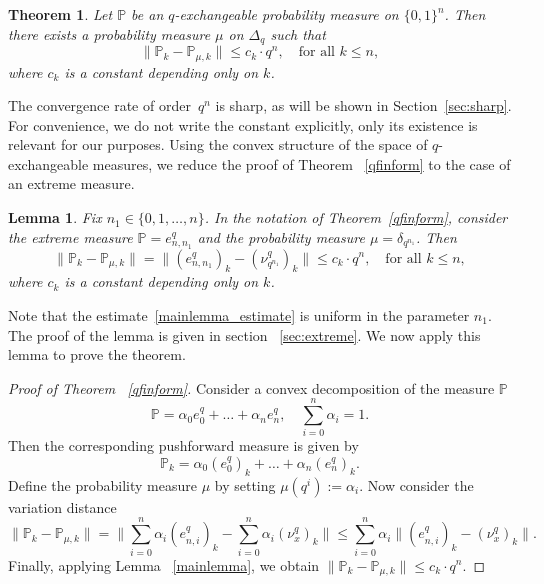 \documentclass[12pt, a4paper]{amsart}
\numberwithin{equation}{subsection}
\newtheorem{theorem}[equation]{Theorem}
\newtheorem{lemma}[equation]{Lemma}
\theoremstyle{definition}
\newcommand{\bP}{{\mathbb P}}
\begin{document}
\begin{theorem}\label{qfinform}
Let $\mathbb{P}$ be an $q$-exchangeable probability measure on $\{0, 1\}^{n}$. Then there exists a probability measure $\mu$ on $\Delta_{q}$ such that
    \begin{equation}
        \|\mathbb{P}_{k} - \mathbb{P}_{\mu,k}\| \leqslant c_{k} \cdot q^{n},  \quad \text{for all } k \leqslant n,
    \end{equation}
   where $c_k$ is a constant depending only on $k$.

\end{theorem}
\noindent The convergence rate of order~$q^{n}$ is sharp, as will be shown in Section~\ref{sec:sharp}. For convenience, we do not write the constant explicitly, only its existence is relevant for our purposes.
Using the convex structure of the space of $q$-exchangeable measures, we reduce the proof of Theorem ~\eqref{qfinform} to the case of an extreme measure.
\begin{lemma}\label{mainlemma} Fix $n_{1} \in \{0,1,\ldots,n\}$. In the notation of Theorem~\eqref{qfinform}, consider the extreme measure $\mathbb{P} = e^{q}_{n, n_{1}}$ and the probability measure $\mu = \delta_{q^{n_{1}}}$. Then
\begin{equation}\label{mainlemma_estimate}
\|\bP_{k} - \bP_{\mu,k}\| = \|(e^{q}_{n, n_{1}})_{k} -  (\nu^{q}_{q^{n_{1}}})_{k}\| \leqslant c_{k} \cdot q^{n}, \quad \text{for all } k \leqslant n,   
\end{equation}
where $c_k$ is a constant depending only on $k$.
\end{lemma}
\noindent Note that the estimate~\eqref{mainlemma_estimate} is uniform in the parameter $n_{1}$. The proof of the lemma is given in section ~\eqref{sec:extreme}. We now apply this lemma to prove the theorem.
\begin{proof}[Proof of Theorem ~\eqref{qfinform}]
Consider a convex decomposition of the measure $\bP$
\begin{equation*}
\bP = \alpha_{0}e^{q}_{0}+\ldots+\alpha_{n}e^{q}_{n}, \quad \sum_{i=0}^{n} \alpha_{i} = 1.
\end{equation*}
Then the corresponding pushforward measure is given by
\begin{equation*}
\bP_{k} = \alpha_{0}(e^{q}_{0})_{k}+\ldots+\alpha_{n}(e^{q}_{n})_{k}.
\end{equation*}
Define the probability measure $\mu$ by setting $\mu(q^{i}):=\alpha_{i}.$
Now consider the variation distance
\begin{equation*}
\|\bP_{k} - \bP_{\mu,k} \| = \|\sum_{i=0}^{n}\alpha_{i} (e^{q}_{n, i})_{k}  - \sum_{i=0}^{n}\alpha_{i} (\nu^{q}_{x})_{k} \| \leqslant \sum_{i=0}^{n} \alpha_{i} \|(e^{q}_{n, i})_{k} -  (\nu^{q}_{x})_{k}\|.
\end{equation*}
Finally, applying Lemma ~\eqref{mainlemma}, we obtain $\|\bP_{k} - \bP_{\mu,k}\| \leqslant c_{k} \cdot q^{n}$.
\end{proof}
\end{document}
